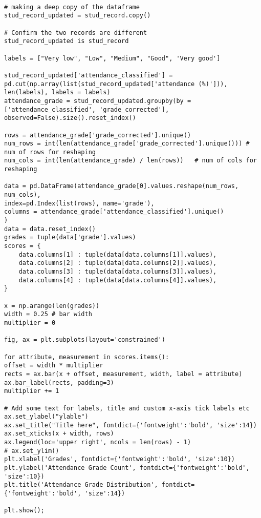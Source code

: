 \label{code:grade_attendance}
\begin{verbatim}
	
# making a deep copy of the dataframe 
stud_record_updated = stud_record.copy()

# Confirm the two records are different
stud_record_updated is stud_record

labels = ["Very low", "Low", "Medium", "Good", 'Very good']

stud_record_updated['attendance_classified'] = pd.cut(np.array(list(stud_record_updated['attendance (%)'])), len(labels), labels = labels)
attendance_grade = stud_record_updated.groupby(by = ['attendance_classified', 'grade_corrected'], observed=False).size().reset_index()

rows = attendance_grade['grade_corrected'].unique()
num_rows = int(len(attendance_grade['grade_corrected'].unique())) # num of rows for reshaping
num_cols = int(len(attendance_grade) / len(rows))   # num of cols for reshaping

data = pd.DataFrame(attendance_grade[0].values.reshape(num_rows, num_cols), 
index=pd.Index(list(rows), name='grade'),
columns = attendance_grade['attendance_classified'].unique()
)
data = data.reset_index()
grades = tuple(data['grade'].values)
scores = {
	data.columns[1] : tuple(data[data.columns[1]].values),
	data.columns[2] : tuple(data[data.columns[2]].values),
	data.columns[3] : tuple(data[data.columns[3]].values),
	data.columns[4] : tuple(data[data.columns[4]].values),
}

x = np.arange(len(grades))
width = 0.25 # bar width
multiplier = 0

fig, ax = plt.subplots(layout='constrained')

for attribute, measurement in scores.items():
offset = width * multiplier 
rects = ax.bar(x + offset, measurement, width, label = attribute)
ax.bar_label(rects, padding=3)
multiplier += 1

# Add some text for labels, title and custom x-axis tick labels etc
ax.set_ylabel("ylable")
ax.set_title("Title here", fontdict={'fontweight':'bold', 'size':14})
ax.set_xticks(x + width, rows)
ax.legend(loc='upper right', ncols = len(rows) - 1)
# ax.set_ylim()
plt.xlabel('Grades', fontdict={'fontweight':'bold', 'size':10})
plt.ylabel('Attendance Grade Count', fontdict={'fontweight':'bold', 'size':10})
plt.title('Attendance Grade Distribution', fontdict={'fontweight':'bold', 'size':14})

plt.show();
\end{verbatim}


